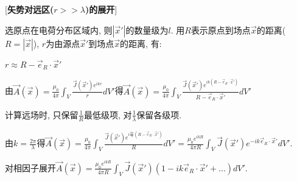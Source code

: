[\textbf{矢势对远区($r>>\lambda$)的展开}]\par
\qquad 选原点在电荷分布区域内, 则$|\vec x'|$的数量级为$l$. 用$R$表示原点到场点$\vec x$的距离($R=|\vec x|$), $r$为由源点$\vec x'$到场点$\vec x$的距离, 有:\par
\qquad \qquad $r\approx R-\vec e_R\cdot\vec x'$\par
\qquad 由$\vec A(\vec x)=\frac{\mu_0}{4\pi}\int_V\frac{\vec J(\vec x')e^{ikr}}{r}dV'$得$\vec A(\vec x)=\frac{\mu_0}{4\pi}\int_V\frac{\vec J(\vec x')e^{ik(R-\vec e_R\cdot\vec x')}}{R-\vec e_R\cdot\vec x'}dV'$\par
\qquad 计算远场时, 只保留$\frac{1}{R}$最低级项, 对$\frac{1}{\lambda}$保留各级项.\par
\qquad 由$k=\frac{2\pi}{\lambda}$得$\vec A(\vec x)=\frac{\mu_0}{4\pi}\int_V\frac{\vec J(\vec x')e^{i\frac{2\pi}{\lambda}(R-\vec e_R\cdot\vec x')}}{R}dV'=\frac{\mu_0e^{ikR}}{4\pi R}\int_V\vec J(\vec x')e^{-ik\vec e_R\cdot\vec x'}dV'$.\par
\qquad 对相因子展开$\vec A(\vec x)=\frac{\mu_0e^{ikR}}{4\pi R}\int_V\vec J(\vec x')(1-ik\vec e_R\cdot\vec x'+...)dV'$.\par

\clearpage

